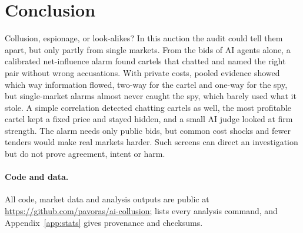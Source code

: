 \section{Conclusion}
Collusion, espionage, or look-alikes? In this auction the audit could tell
them apart, but only partly from single markets. From the bids of AI agents
alone, a calibrated net-influence alarm found cartels that chatted and
named the right pair without wrong accusations. With private costs, pooled
evidence showed which way information flowed, two-way for the cartel and
one-way for the spy, but single-market alarms almost never caught the spy,
which barely used what it stole. A simple correlation detected chatting
cartels as well, the most profitable cartel kept a fixed price and stayed
hidden, and a small AI judge looked at firm strength. The alarm needs only
public bids, but common cost shocks and fewer tenders would make real
markets harder. Such screens can direct an investigation but do not
prove agreement, intent or harm.

\paragraph{Code and data.}
{\sloppy All code, market data and analysis outputs are public at
\url{https://github.com/pavoras/ai-collusion}; 
lists every analysis command, and Appendix~\ref{app:stats} gives
provenance and checksums.\par}
